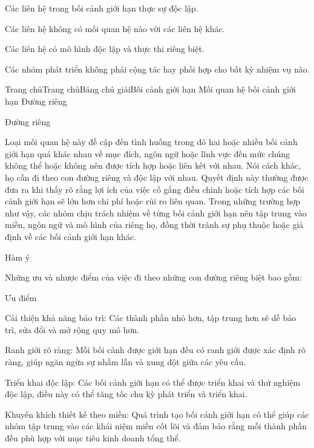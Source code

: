 
Các liên hệ trong bối cảnh giới hạn thực sự độc lập.

Các liên hệ không có mối quan hệ nào với các liên hệ khác.

Các liên hệ có mô hình độc lập và thực thi riêng biệt.

Các nhóm phát triển không phải cộng tác hay phối hợp cho bất kỳ nhiệm vụ nào.




Trang chủTrang chủBảng chú giảiBối cảnh giới hạn Mối quan hệ bối cảnh giới hạn Đường riêng

Đường riêng

Loại mối quan hệ này đề cập đến tình huống trong đó hai hoặc nhiều bối cảnh giới hạn quá khác nhau về mục đích, ngôn ngữ hoặc lĩnh vực đến mức chúng không thể hoặc không nên được tích hợp hoặc liên kết với nhau. Nói cách khác, họ cần đi theo con đường riêng và độc lập với nhau. Quyết định này thường được đưa ra khi thấy rõ rằng lợi ích của việc cố gắng điều chỉnh hoặc tích hợp các bối cảnh giới hạn sẽ lớn hơn chi phí hoặc rủi ro liên quan. Trong những trường hợp như vậy, các nhóm chịu trách nhiệm về từng bối cảnh giới hạn nên tập trung vào miền, ngôn ngữ và mô hình của riêng họ, đồng thời tránh sự phụ thuộc hoặc giả định về các bối cảnh giới hạn khác.

Hàm ý

Những ưu và nhược điểm của việc đi theo những con đường riêng biệt bao gồm:

Ưu điểm

Cải thiện khả năng bảo trì: Các thành phần nhỏ hơn, tập trung hơn sẽ dễ bảo trì, sửa đổi và mở rộng quy mô hơn.

Ranh giới rõ ràng: Mỗi bối cảnh được giới hạn đều có ranh giới được xác định rõ ràng, giúp ngăn ngừa sự nhầm lẫn và xung đột giữa các yêu cầu.

Triển khai độc lập: Các bối cảnh giới hạn có thể được triển khai và thử nghiệm độc lập, điều này có thể tăng tốc chu kỳ phát triển và triển khai.

Khuyến khích thiết kế theo miền: Quá trình tạo bối cảnh giới hạn có thể giúp các nhóm tập trung vào các khái niệm miền cốt lõi và đảm bảo rằng mỗi thành phần đều phù hợp với mục tiêu kinh doanh tổng thể.


